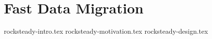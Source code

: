 \chapter{Fast Data Migration}

 {rocksteady-intro.tex}
 {rocksteady-motivation.tex}
 {rocksteady-design.tex}
